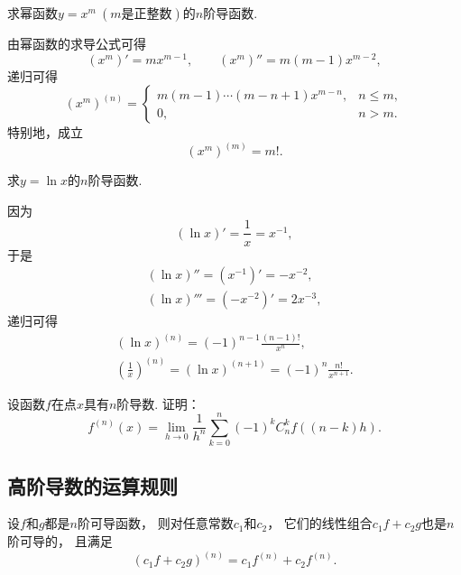 \begin{example}
求幂函数\(y = x^m\ (\text{$m$是正整数})\)的\(n\)阶导函数.
\begin{solution}
由幂函数的求导公式可得\[
	(x^m)' = m x^{m-1},
	\qquad
	(x^m)'' = m(m-1) x^{m-2},
\]
递归可得\begin{equation}
	(x^m)^{(n)} = \left\{ \begin{array}{cl}
		m(m-1)\dotsm(m-n+1) x^{m-n}, & n \leq m, \\
		0, & n > m.
	\end{array} \right.
\end{equation}
特别地，成立\begin{equation}
	(x^m)^{(m)} = m!.
\end{equation}
\end{solution}
\end{example}

\begin{example}
求\(y = \ln x\)的\(n\)阶导函数.
\begin{solution}
因为\[
	(\ln x)' = \frac1x = x^{-1},
\]
于是\begin{gather*}
	(\ln x)'' = (x^{-1})' = -x^{-2}, \\
	(\ln x)''' = (-x^{-2})' = 2x^{-3},
\end{gather*}
递归可得\begin{gather}
	(\ln x)^{(n)}
	= (-1)^{n-1} \frac{(n-1)!}{x^n}, \\
	\left(\frac1x\right)^{(n)}
	= (\ln x)^{(n+1)}
	= (-1)^n \frac{n!}{x^{n+1}}.
\end{gather}
\end{solution}
\end{example}

\begin{example}
设函数\(f\)在点\(x\)具有\(n\)阶导数.
证明：\[
	f^{(n)}(x)
	= \lim_{h\to0} \frac1{h^n} \sum_{k=0}^n (-1)^k C_n^k f((n-k)h).
\]
\end{example}

\subsection{高阶导数的运算规则}
\begin{theorem}
设\(f\)和\(g\)都是\(n\)阶可导函数，
则对任意常数\(c_1\)和\(c_2\)，
它们的线性组合\(c_1 f + c_2 g\)也是\(n\)阶可导的，
且满足\begin{equation}
	(c_1 f + c_2 g)^{(n)}
	= c_1 f^{(n)} + c_2 f^{(n)}.
\end{equation}
\end{theorem}

